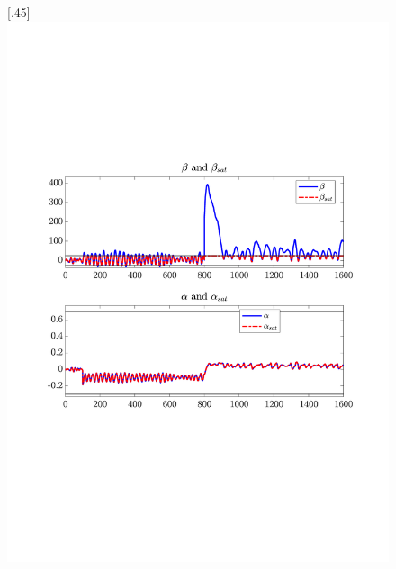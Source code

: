 \begin{figure}[H]
    [.45\textwidth]{\includegraphics[width=1\linewidth, scale=1, trim=60 230 55 150,clip]{fig/Open_loop/exp_5_in.pdf}}
%

\end{figure}
